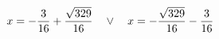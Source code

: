 \documentclass[preview]{standalone}
\begin{document}
\begin{align*}
\special{dvisvgm:raw <g id='unique000'>}x=- \frac{3}{16} + \frac{\sqrt{329}}{16} \quad \lor \quad x=- \frac{\sqrt{329}}{16} - \frac{3}{16}\special{dvisvgm:raw </g>}
\end{align*}
\end{document}
